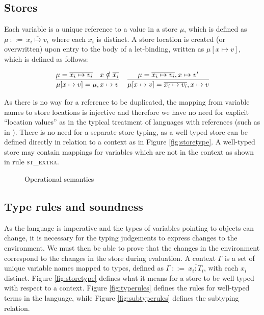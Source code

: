 \documentclass[preprint]{sigplanconf}
\newcommand{\figref}[1]{Figure \ref{#1}}
\begin{document}
\subsection{Stores}

Each variable is a unique reference to a value in a store $\mu$, which is 
defined as $\mu\:\mathrm{::=}\:\overline{x_i \mapsto v_i}$ where each $x_i$ is
distinct. A store location
is created (or overwritten) upon entry to the body of a let-binding, written as
$\mu[x \mapsto v]$, which is defined as follows:

\[
\begin{tabular}{cc}
\infer
{\mu[x \mapsto v] = \mu, x \mapsto v}
{\mu = \overline{x_i \mapsto v_i} & x \notin \overline{x_i}}
&
\infer
{\mu[x \mapsto v] = \overline{x_i \mapsto v_i} , x \mapsto v}
{\mu = \overline{x_i \mapsto v_i}, x \mapsto v'}
\end{tabular}
\]

As there is no way for a reference to be duplicated, the mapping
from variable names to store locations is injective and therefore we have
no need for explicit ``location values'' as in the typical treatment of 
languages with references (such as in \cite{Pierce2002}). There is no need
for a separate store typing, as a well-typed store can be defined directly
in relation to a context as in \figref{fig:storetype}. A well-typed store
may contain mappings for variables which are not in the context as shown in
rule \textsc{st\_extra}.

\begin{figure}

\ottdefnreduce

\caption{\label{fig:opsemantics} Operational semantics}
\end{figure}

\subsection{Type rules and soundness}

As the language is imperative and the types of variables pointing to objects can
change, it is necessary for the typing judgements to express changes to the 
environment. We must then be able
to prove that the changes in the environment correspond to the changes in the
store during evaluation. A context $\Gamma$ is a set of unique variable names 
mapped to types, defined as $\Gamma\:\mathrm{::=}\:\overline{x_i : T_i}$,
with each $x_i$ distinct. \figref{fig:storetype} defines what it means for
a store to be well-typed with respect to a
context. \figref{fig:typerules} defines the rules for well-typed terms
in the language, while \figref{fig:subtyperules} defines the subtyping
relation.
\end{document}
